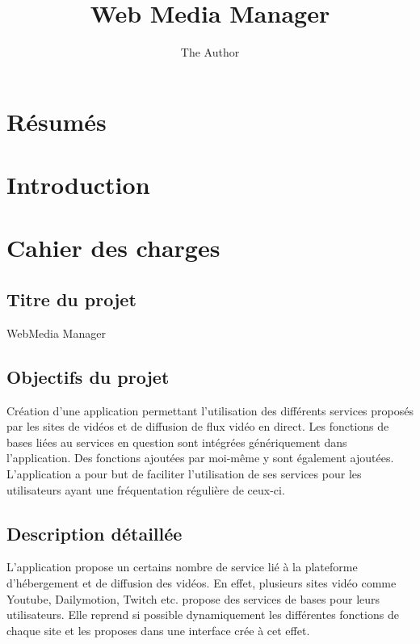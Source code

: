 \documentclass[11pt]{report} %
\title{Web Media Manager}
\author{The Author}
\begin{document}
	
\maketitle
\newpage

\tableofcontents

\chapter{Résumés}

\chapter{Introduction}

\chapter{Cahier des charges}
	\section{Titre du projet}
	WebMedia Manager

	\section{Objectifs du projet}
	Création d’une application permettant l’utilisation des différents services proposés par les sites de vidéos et de diffusion de flux vidéo en direct.
	Les fonctions de bases liées au services en question sont intégrées génériquement dans l’application.
	Des fonctions ajoutées par moi-même y sont également ajoutées.
	L’application a pour but de faciliter l’utilisation de ses services pour les utilisateurs ayant une fréquentation régulière de ceux-ci.

	\section{Description détaillée}
	L’application propose un certains nombre de service lié à la plateforme d’hébergement et de diffusion des vidéos. En effet, plusieurs sites vidéo comme Youtube, Dailymotion, Twitch etc. propose des services de bases pour leurs utilisateurs.
	Elle reprend si possible dynamiquement les différentes fonctions de chaque site et les proposes dans une interface crée à cet effet.
\end{document}
